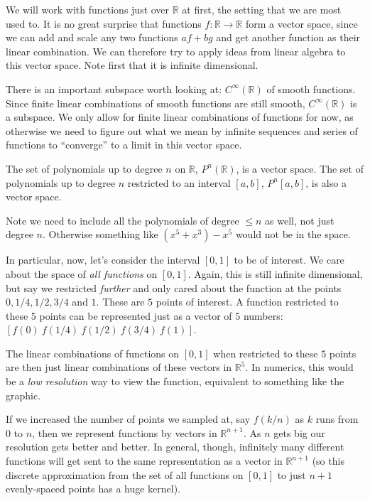 	We will work with functions just over $\mathbb R$ at first, the setting that we are most used to. It is no great surprise that functions $f:\mathbb{R} \rightarrow \mathbb R$ form a vector space, since we can add and scale any two functions $a f + b g$ and get another function as their linear combination. We can therefore try to apply ideas from linear algebra to this vector space. Note first that it is infinite dimensional. 
	
	There is an important subspace worth looking at: $C^{\infty} (\mathbb R)$ of smooth functions. Since finite linear combinations of smooth functions are still smooth, $C^{\infty} (\mathbb R)$ is a subspace. We only allow for finite linear combinations of functions for now, as otherwise we need to figure out what we mean by infinite sequences and series of functions to ``converge'' to a limit in this vector space. 
	
	\begin{example}
		The set of polynomials up to degree $n$ on $\mathbb{R}$, $P^n(\mathbb R)$, is a vector space. The set of polynomials up to degree $n$ restricted to an interval $[a,b]$, $P^n[a,b]$, is also a vector space. 
	\end{example}
	Note we need to include all the polynomials of degree $\leq n$ as well, not just degree $n$. Otherwise something like $(x^{5} + x^{3}) - x^{5}$ would not be in the space. 
	
	In particular, now, let's consider the interval $[0,1]$ to be of interest. We care about the space of \emph{all functions} on $[0,1]$. Again, this is still infinite dimensional, but say we restricted \emph{further} and only cared about the function at the points $0, 1/4, 1/2, 3/4$ and $1$. These are $5$ points of interest. A function restricted to these $5$ points can be represented just as a vector of $5$ numbers: $[f(0) ~ f(1/4) ~ f(1/2) ~ f(3/4) ~ f(1)]$.
	
	The linear combinations of functions on $[0,1]$ when restricted to these $5$ points are then just linear combinations of these vectors in $\mathbb{R}^5$. In numerics, this would be a \emph{low resolution} way to view the function, equivalent to something like the graphic.

	
	If we increased the number of points we sampled at, say $f(k/n)$ as $k$ runs from $0$ to $n$, then we represent functions by vectors in $\mathbb{R}^{n+1}$. As $n$ gets big our resolution gets better and better. In general, though, infinitely many different functions will get sent to the same representation as a vector in $\mathbb{R}^{n+1}$ (so this discrete approximation from the set of all functions on $[0,1]$ to just $n+1$ evenly-spaced points has a huge kernel).
	
